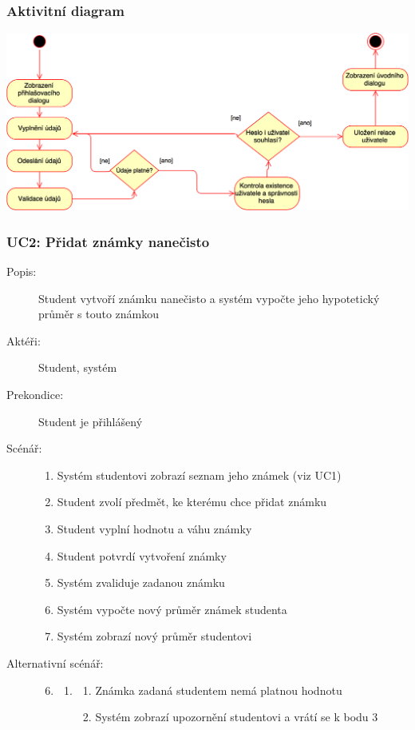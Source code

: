 \documentclass[a4paper,10pt,titlepage]{article}
\begin{document}
	\subsubsection*{Aktivitní diagram}
	\includegraphics[width=\textwidth]{vis_uc0_activity}
	\vspace{5mm}
	
	\subsubsection*{UC2: Přidat známky nanečisto}
	\begin{description}
		\item[Popis:] Student vytvoří známku nanečisto a systém vypočte jeho hypotetický průměr s touto známkou
		\item[Aktéři:] Student, systém
		\item[Prekondice:] Student je přihlášený
		\item[Scénář:] \hfill
				\begin{enumerate}
					\item Systém studentovi zobrazí seznam jeho známek (viz UC1)
					\item Student zvolí předmět, ke kterému chce přidat známku
					\item Student vyplní hodnotu a váhu známky
					\item Student potvrdí vytvoření známky
					\item Systém zvaliduje zadanou známku
					\item Systém vypočte nový průměr známek studenta
					\item Systém zobrazí nový průměr studentovi
				\end{enumerate}
		\item[Alternativní scénář:] \hfill
				\begin{enumerate}
					\setcounter{enumi}{5}
					\setcounter{enumii}{1}
					\item \begin{enumerate}[label*=\arabic*.,leftmargin=8pt]
						\item
							\begin{enumerate}[label=\alph*.]
								\item Známka zadaná studentem nemá platnou hodnotu
								\item Systém zobrazí upozornění studentovi a vrátí se k bodu 3
							\end{enumerate}
					\end{enumerate}		
				\end{enumerate}
	\end{description}
\end{document}
